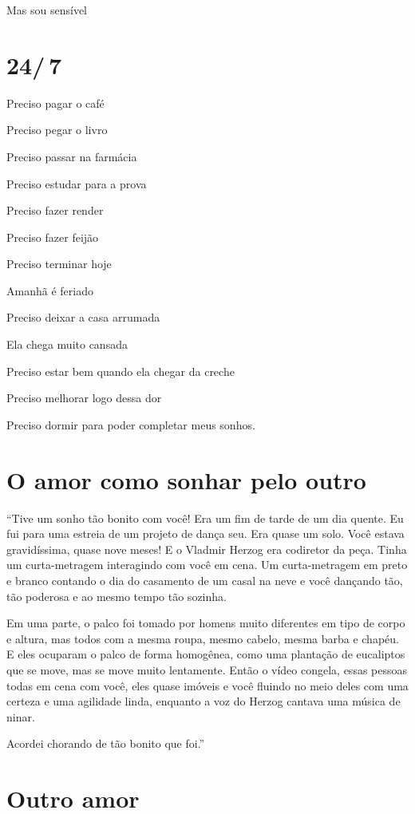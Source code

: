 {Mas sou sensível

\chapter{24/\,7}

Preciso pagar o café

Preciso pegar o livro

Preciso passar na farmácia

Preciso estudar para a prova

Preciso fazer render

Preciso fazer feijão

Preciso terminar hoje

Amanhã é feriado

Preciso deixar a casa arrumada

Ela chega muito cansada

Preciso estar bem quando ela chegar da creche

Preciso melhorar logo dessa dor

Preciso dormir para poder completar meus sonhos.
}
\chapter{O amor como sonhar pelo outro}

``Tive um sonho tão bonito com você! Era um fim de tarde de um dia
quente. Eu fui para uma estreia de um projeto de dança seu. Era quase um
solo. Você estava gravidíssima, quase nove meses! E o Vladmir Herzog era
codiretor da peça. Tinha um curta-metragem interagindo com você em cena.
Um curta-metragem em preto e branco contando o dia do casamento de um
casal na neve e você dançando tão, tão poderosa e ao mesmo tempo tão
sozinha.

Em uma parte, o palco foi tomado por homens muito diferentes em tipo de
corpo e altura, mas todos com a mesma roupa, mesmo cabelo, mesma barba e
chapéu. E eles ocuparam o palco de forma homogênea, como uma plantação
de eucaliptos que se move, mas se move muito lentamente. Então o vídeo
congela, essas pessoas todas em cena com você, eles quase imóveis e você
fluindo no meio deles com uma certeza e uma agilidade linda, enquanto a
voz do Herzog cantava uma música de ninar.

Acordei chorando de tão bonito que foi.''

\chapter{Outro amor}

